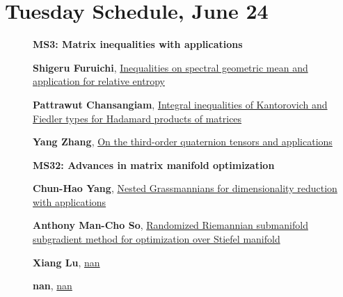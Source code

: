 \documentclass[ILAS2025-program.tex]{subfiles}
\begin{document}
    \newpage

\section*{Tuesday Schedule, June 24 }
        
        \begin{description}
    \item[] {\color{mstitle}\textbf{MS3: Matrix inequalities with applications}} 
    \item[] \hypertarget{up0144}{}\textbf{Shigeru Furuichi}, \hyperlink{down0144}{Inequalities on spectral geometric mean and application for relative entropy}
        \item[] \hypertarget{up0145}{}\textbf{Pattrawut Chansangiam}, \hyperlink{down0145}{Integral inequalities of Kantorovich and Fiedler types for Hadamard products of matrices}
        \item[] \hypertarget{up0146}{}\textbf{Yang Zhang}, \hyperlink{down0146}{On the third-order quaternion tensors and applications
}
        \end{description}
    \begin{description}
    \item[] {\color{mstitle}\textbf{MS32: Advances in matrix manifold optimization}} 
    \item[] \hypertarget{up0185}{}\textbf{Chun-Hao Yang}, \hyperlink{down0185}{Nested Grassmannians for dimensionality reduction with applications}
        \item[] \hypertarget{up0186}{}\textbf{Anthony Man-Cho So}, \hyperlink{down0186}{Randomized Riemannian submanifold subgradient method for optimization over Stiefel manifold}
        \item[] \hypertarget{up0187}{}\textbf{Xiang Lu}, \hyperlink{down0187}{nan}
        \item[] \hypertarget{up0188}{}\textbf{nan}, \hyperlink{down0188}{nan}
        \end{description}
\end{document}
